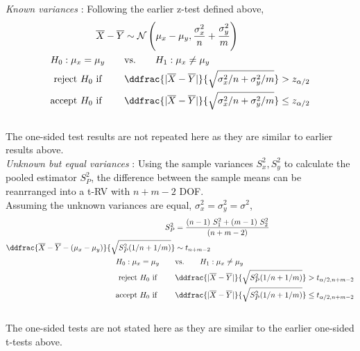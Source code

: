 \textit{Known variances} : Following the earlier z-test defined above, \\

\begin{align}
	\overline{X} - \overline{Y} &\sim \mathcal{N}\left( \mu_x - \mu_y, \frac{\sigma_x^2}{n} + \frac{\sigma_y^2}{m} \right) \nonumber \\
	H_0 : \mu_x = \mu_y \qquad &\text{vs.} \qquad H_1 : \mu_x \neq \mu_y \nonumber \\
	\text{reject $ H_0 $ if } \qquad & \ddfrac{| \overline{X} - \overline{Y} |}{\sqrt{\sigma_x^2/n + \sigma_y^2/m}} > z_{\alpha/2}  \nonumber \\
	\text{accept $ H_0 $ if } \qquad & \ddfrac{| \overline{X} - \overline{Y} |}{\sqrt{\sigma_x^2/n + \sigma_y^2/m}} \leq z_{\alpha/2}
\end{align}\\

The one-sided test results are not repeated here as they are similar to earlier results above. \\

\textit{Unknown but equal variances} : Using the sample variances $ S_x^2, S_y^2 $ to calculate the pooled estimator $ S_P^2 $, the difference between the sample means can be reanrranged into a t-RV with $ n+m-2 $ DOF.\\

Assuming the unknown variances are equal, $ \sigma_x^2 = \sigma_y^2 = \sigma^2$, \\

\begin{align}
	S_P^2 &= \frac{(n-1)\ S_1^2 + (m-1)\ S_2^2}{(n+m-2)} \nonumber \\
	\ddfrac{\overline{X} - \overline{Y} - (\mu_x - \mu_y)}{\sqrt{S_P^2(1/n + 1/m)}} &\sim t_{n+m-2} \nonumber \\
	H_0 : \mu_x = \mu_y \qquad &\text{vs.} \qquad H_1 : \mu_x \neq \mu_y  \nonumber\\
	\text{reject $ H_0 $ if } \qquad & \ddfrac{| \overline{X} - \overline{Y} |}{\sqrt{S_P^2(1/n + 1/m)}} > t_{\alpha/2, n+m-2}  \nonumber \\
	\text{accept $ H_0 $ if } \qquad & \ddfrac{| \overline{X} - \overline{Y} |}{\sqrt{S_P^2(1/n + 1/m)}} \leq t_{\alpha/2, n+m-2}
\end{align}\\

The one-sided tests are not stated here as they are similar to the earlier one-sided t-tests above.\\

